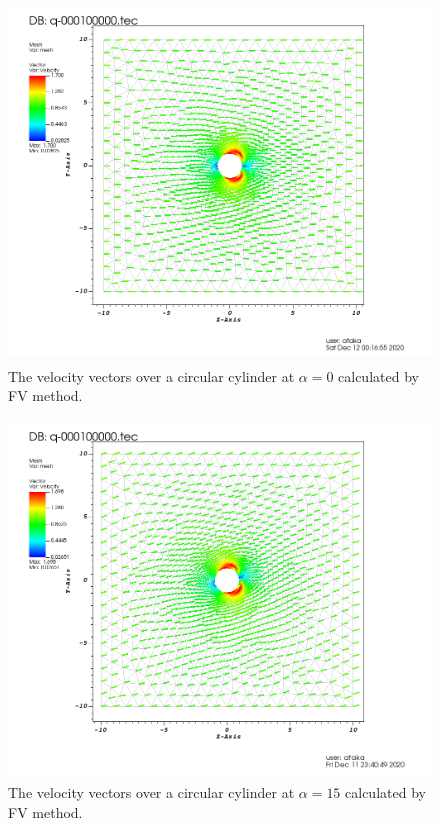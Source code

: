 \documentclass[letterpaper,12pt]{article}
\begin{document}
\begin{figure} [!h]
	\centering
	\includegraphics[height = 9.5cm]{graph/0deg/Cylinder_0angle_vector0000.png}
	\caption{The velocity vectors over a circular cylinder at $\alpha=0$ calculated by FV method.}
    \label{fig:q2v0}
\end{figure}

\begin{figure} [!h]
	\centering
	\includegraphics[height = 9.5cm]{graph/15deg/Cylinder_15angle_vector0000.png}
	\caption{The velocity vectors over a circular cylinder at $\alpha=15$ calculated by FV method.}
    \label{fig:q2v15}
\end{figure}

\newpage
\end{document}
